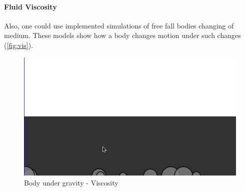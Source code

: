 \documentclass[
12pt,				%
openright,			%
oneside,			%
a4paper,			%
brazil,				%
english,			  %
]{abntex2}
\begin{document}
\paragraph{Fluid Viscosity}
Also, one could use implemented simulations of free fall bodies
changing of medium. These models show how a body changes motion
under such changes (\autoref{fig:vis}). 

\begin{figure}[ht]
  \centering
    \caption{\label{fig:vis} Body under gravity - Viscosity}
  \includegraphics[width=0.7\linewidth]{Imagens/CA/fv-is.png}
\end{figure}




\end{document}
